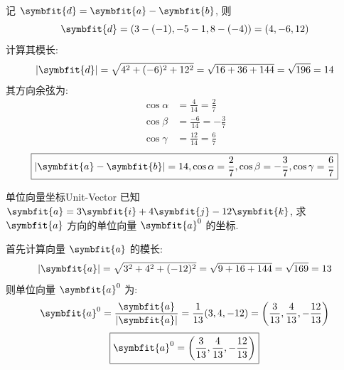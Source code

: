 \begin{solution}
    记 $\symbfit{d} = \symbfit{a} - \symbfit{b}$, 则
    \begin{equation*}
        \symbfit{d} = (3 - (-1), -5 - 1, 8 - (-4)) = (4, -6, 12)
    \end{equation*}
    计算其模长:
    \begin{equation*}
        |\symbfit{d}| = \sqrt{4^2 + (-6)^2 + 12^2} = \sqrt{16 + 36 + 144} = \sqrt{196} = 14
    \end{equation*}
    其方向余弦为:
    \begin{equation*}
        \begin{aligned}
            \cos \alpha & = \frac{4}{14} = \frac{2}{7}   \\
            \cos \beta  & = \frac{-6}{14} = -\frac{3}{7} \\
            \cos \gamma & = \frac{12}{14} = \frac{6}{7}
        \end{aligned}
    \end{equation*}
    \begin{equation*}
        \boxed{|\symbfit{a} - \symbfit{b}| = 14, \cos \alpha = \frac{2}{7}, \cos \beta = -\frac{3}{7}, \cos \gamma = \frac{6}{7}}
    \end{equation*}
\end{solution}


\begin{problem}{单位向量坐标}{Unit-Vector}
    已知 $\symbfit{a} = 3\symbfit{i} + 4\symbfit{j} - 12\symbfit{k}$, 求 $\symbfit{a}$ 方向的单位向量 $\symbfit{a}^0$ 的坐标.
\end{problem}

\begin{solution}
    首先计算向量 $\symbfit{a}$ 的模长:
    \begin{equation*}
        |\symbfit{a}| = \sqrt{3^2 + 4^2 + (-12)^2} = \sqrt{9 + 16 + 144} = \sqrt{169} = 13
    \end{equation*}
    则单位向量 $\symbfit{a}^0$ 为:
    \begin{equation*}
        \symbfit{a}^0 = \frac{\symbfit{a}}{|\symbfit{a}|} = \frac{1}{13} (3, 4, -12) = \left( \frac{3}{13}, \frac{4}{13}, -\frac{12}{13} \right)
    \end{equation*}
    \begin{equation*}
        \boxed{\symbfit{a}^0 = \left( \frac{3}{13}, \frac{4}{13}, -\frac{12}{13} \right)}
    \end{equation*}
\end{solution}


